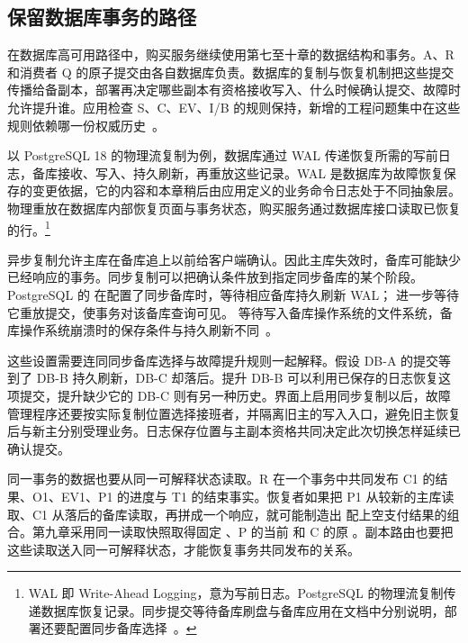 \subsection*{保留数据库事务的路径}

在数据库高可用路径中，购买服务继续使用第七至十章的数据结构和事务。A、R 和消费者 Q 的原子提交由各自数据库负责。数据库的复制与恢复机制把这些提交传播给备副本，部署再决定哪些副本有资格接收写入、什么时候确认提交、故障时允许提升谁。应用检查 S、C、EV、I/B 的规则保持，新增的工程问题集中在这些规则依赖哪一份权威历史~\cite{pg}。

以 PostgreSQL 18 的物理流复制为例，数据库通过 WAL 传递恢复所需的写前日志，备库接收、写入、持久刷新，再重放这些记录。WAL 是数据库为故障恢复保存的变更依据，它的内容和本章稍后由应用定义的业务命令日志处于不同抽象层。物理重放在数据库内部恢复页面与事务状态，购买服务通过数据库接口读取已恢复的行。\footnote{WAL 即 Write-Ahead Logging，意为写前日志。PostgreSQL 的物理流复制传递数据库恢复记录。同步提交等待备库刷盘与备库应用在文档中分别说明，部署还要配置同步备库选择~\cite{pg}。}

异步复制允许主库在备库追上以前给客户端确认。因此主库失效时，备库可能缺少已经响应的事务。同步复制可以把确认条件放到指定同步备库的某个阶段。PostgreSQL 的  在配置了同步备库时，等待相应备库持久刷新 WAL； 进一步等待它重放提交，使事务对该备库查询可见。 等待写入备库操作系统的文件系统，备库操作系统崩溃时的保存条件与持久刷新不同~\cite{pg}。


这些设置需要连同同步备库选择与故障提升规则一起解释。假设 DB-A 的提交等到了 DB-B 持久刷新，DB-C 却落后。提升 DB-B 可以利用已保存的日志恢复这项提交，提升缺少它的 DB-C 则有另一种历史。界面上启用同步复制以后，故障管理程序还要按实际复制位置选择接班者，并隔离旧主的写入入口，避免旧主恢复后与新主分别受理业务。日志保存位置与主副本资格共同决定此次切换怎样延续已确认提交。

同一事务的数据也要从同一可解释状态读取。R 在一个事务中共同发布 C1 的结果、O1、EV1、P1 的进度与 T1 的结束事实。恢复者如果把 P1 从较新的主库读取、C1 从落后的备库读取，再拼成一个响应，就可能制造出  配上空支付结果的组合。第九章采用同一读取快照取得固定 、P 的当前  和 C 的原 。副本路由也要把这些读取送入同一可解释状态，才能恢复事务共同发布的关系。



